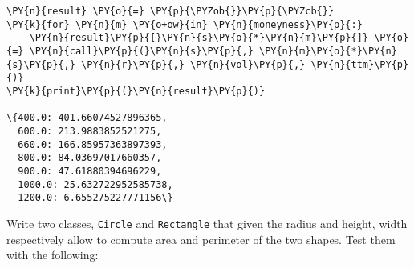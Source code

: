 \begin{Answer}
\begin{tcolorbox}[size=fbox, boxrule=1pt, colback=cellbackground, colframe=cellborder]
\begin{Verbatim}[commandchars=\\\{\}]
\PY{n}{result} \PY{o}{=} \PY{p}{\PYZob{}}\PY{p}{\PYZcb{}}
\PY{k}{for} \PY{n}{m} \PY{o+ow}{in} \PY{n}{moneyness}\PY{p}{:}
    \PY{n}{result}\PY{p}{[}\PY{n}{s}\PY{o}{*}\PY{n}{m}\PY{p}{]} \PY{o}{=} \PY{n}{call}\PY{p}{(}\PY{n}{s}\PY{p}{,} \PY{n}{m}\PY{o}{*}\PY{n}{s}\PY{p}{,} \PY{n}{r}\PY{p}{,} \PY{n}{vol}\PY{p}{,} \PY{n}{ttm}\PY{p}{)}
\PY{k}{print}\PY{p}{(}\PY{n}{result}\PY{p}{)}

\{400.0: 401.66074527896365,
  600.0: 213.9883852521275,
  660.0: 166.85957363897393,
  800.0: 84.03697017660357,
  900.0: 47.61880394696229,
  1000.0: 25.632722952585738,
  1200.0: 6.655275227771156\}
\end{Verbatim}
\end{tcolorbox}
\end{Answer}

\begin{Exercise}
Write two classes, \texttt{Circle} and \texttt{Rectangle} that given the radius and height, width respectively allow to compute area and perimeter of the two shapes. Test them with the following:

\begin{Shaded}
\begin{Highlighting}[]
\OperatorTok{=}\NormalTok{)}
\NormalTok{ (}\SpecialCharTok{\{\}}

\OperatorTok{=}\NormalTok{, }\NormalTok{)}
\NormalTok{ (}\SpecialCharTok{\{\}}\SpecialCharTok{\{\}}\NormalTok{ \textbackslash{}}
\end{Highlighting}
\end{Shaded}
\end{Exercise}

